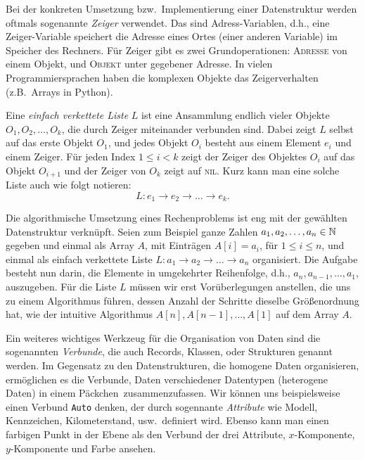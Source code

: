 \begin{bem} 
Bei der konkreten Umsetzung bzw.~Implementierung einer Datenstruktur werden oftmals sogenannte \emph{Zeiger} verwendet.
Das sind Adress-Variablen, d.h., eine Zeiger-Variable speichert die Adresse eines Ortes (einer anderen Variable) im Speicher des Rechners.
Für Zeiger gibt es zwei Grundoperationen: \textsc{Adresse} von einem Objekt, und \textsc{Objekt} unter gegebener Adresse. In vielen Programmiersprachen haben die komplexen Objekte das Zeigerverhalten (z.B.~Arrays in Python). 
\end{bem} 

\begin{bsp}
	Eine \emph{einfach verkettete Liste} $L$ ist eine Ansammlung endlich vieler Objekte $O_1,O_2,\ldots,O_k$, die durch Zeiger miteinander verbunden sind.
	Dabei zeigt $L$ selbst auf das erste Objekt $O_1$, und jedes Objekt $O_i$ besteht aus einem Element $e_i$ und einem Zeiger.
	Für jeden Index $1 \leq i < k$ zeigt der Zeiger des Objektes $O_i$ auf das Objekt $O_{i+1}$ und der Zeiger von $O_k$ zeigt auf \textsc{nil}.
	Kurz kann man eine solche Liste auch wie folgt notieren:
	\[
	L : e_1 \to e_2 \to \ldots \to e_k.
	\]
\end{bsp}

\begin{bem} 
Die algorithmische Umsetzung eines Rechenproblems ist eng mit der gewählten Datenstruktur verknüpft.
Seien zum Beispiel ganze Zahlen $a_1,a_2,\ldots,a_n \in \mathbb{N}$ gegeben und einmal als Array $A$, mit Einträgen $A[i] = a_i$, für $1 \leq i \leq n$, und einmal als einfach verkettete Liste $L : a_1 \to a_2 \to \ldots \to a_n$ organisiert.
Die Aufgabe besteht nun darin, die Elemente in umgekehrter Reihenfolge, d.h., $a_n,a_{n-1},\ldots,a_1$, auszugeben.
Für die Liste $L$ müssen wir erst Vorüberlegungen anstellen, die uns zu einem Algorithmus führen, dessen Anzahl der Schritte dieselbe Größenordnung hat, wie der intuitive Algorithmus $A[n],A[n-1],\ldots,A[1]$ auf dem Array $A$.
\end{bem} 

\begin{bem} 
Ein weiteres wichtiges Werkzeug für die Organisation von Daten sind die sogenannten \emph{Verbunde}, die auch Records, Klassen, oder Strukturen genannt werden.
Im Gegensatz zu den Datenstrukturen, die homogene Daten organisieren, ermöglichen es die Verbunde, Daten verschiedener Datentypen (heterogene Daten) in einem \glqq Päckchen\grqq\ zusammenzufassen.
Wir können uns beispielsweise einen Verbund \texttt{Auto} denken, der durch sogennante \emph{Attribute} wie Modell, Kennzeichen, Kilometerstand, usw.~definiert wird.
Ebenso kann man einen farbigen Punkt in der Ebene als den Verbund der drei Attribute, $x$-Komponente, $y$-Komponente und Farbe ansehen. 
\end{bem} 



